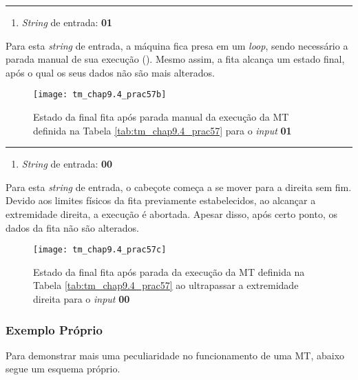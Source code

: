 \hrule

\begin{enumerate}[resume*]
    \item \textit{String} de entrada: \textbf{01}
\end{enumerate}

\noindent
Para esta \textit{string} de entrada, a máquina fica presa em um \textit{loop},
sendo necessário a parada manual de sua execução (). Mesmo assim,
a fita alcança um estado final, após o qual os seus dados não são mais
alterados.

\begin{figure}[H]
    \centering
    \texttt{[image: tm\_chap9.4\_prac57b]}
    \caption{
        Estado da final fita após parada manual da execução da MT definida na
        Tabela \ref{tab:tm_chap9.4_prac57} para o \textit{input} \textbf{01}
    }
    \label{fig:tm_chap9.4_prac57b}
\end{figure}

\hrule

\begin{enumerate}[resume*]
    \item \textit{String} de entrada: \textbf{00}
\end{enumerate}

\noindent
Para esta \textit{string} de entrada, o cabeçote começa a se mover para a
direita sem fim. Devido aos limites físicos da fita previamente estabelecidos,
ao alcançar a extremidade direita, a execução é abortada. Apesar disso, após
certo ponto, os dados da fita não são alterados.

\begin{figure}[H]
    \centering
    \texttt{[image: tm\_chap9.4\_prac57c]}
    \caption{
        Estado da final fita após parada da execução da MT definida na
        Tabela \ref{tab:tm_chap9.4_prac57} ao ultrapassar a extremidade direita
        para o \textit{input} \textbf{00}
    }
    \label{fig:tm_chap9.4_prac57c}
\end{figure}

\subsubsection*{Exemplo Próprio}

Para demonstrar mais uma peculiaridade no funcionamento de uma MT, abaixo segue
um esquema próprio.

